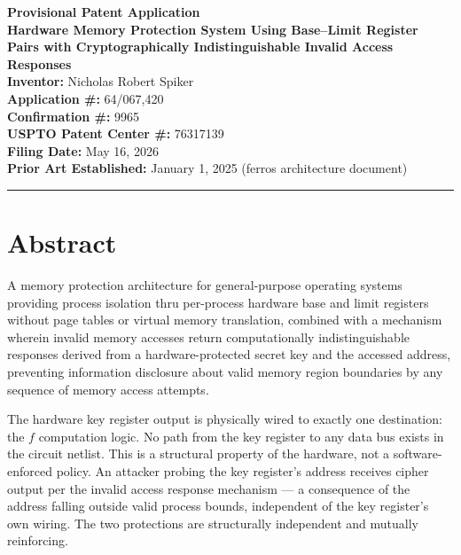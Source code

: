 \documentclass[12pt,letterpaper]{article}
\begin{document}

\begin{center}
  {\LARGE\bfseries Provisional Patent Application}\\[1.5em]
  {\large\bfseries Hardware Memory Protection System Using Base--Limit Register Pairs with Cryptographically Indistinguishable Invalid Access Responses}\\[1.5em]
  \textbf{Inventor:} Nicholas Robert Spiker\\
  \textbf{Application \#:} 64/067,420\\
  \textbf{Confirmation \#:} 9965\\
  \textbf{USPTO Patent Center \#:} 76317139\\
  \textbf{Filing Date:} May 16, 2026\\
  \textbf{Prior Art Established:} January 1, 2025 (ferros architecture document)
\end{center}

\vspace{1em}
\hrule
\vspace{2em}

\section{Abstract}

A memory protection architecture for general-purpose operating systems
providing process isolation thru per-process hardware base and limit
registers without page tables or virtual memory translation, combined with
a mechanism wherein invalid memory accesses return computationally
indistinguishable responses derived from a hardware-protected secret key
and the accessed address, preventing information disclosure about valid
memory region boundaries by any sequence of memory access attempts.

The hardware key register output is physically wired to exactly one
destination: the $f$ computation logic. No path from the key register
to any data bus exists in the circuit netlist. This is a structural
property of the hardware, not a software-enforced policy. An attacker
probing the key register's address receives cipher output per the
invalid access response mechanism --- a consequence of the address
falling outside valid process bounds, independent of the key register's
own wiring. The two protections are structurally independent and
mutually reinforcing.
\end{document}
